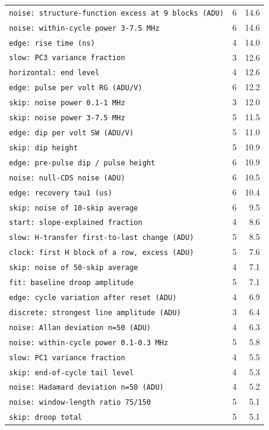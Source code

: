 \documentclass[10pt]{article}
\renewcommand{\_}{\oldunderscore\allowbreak}
\begin{document}
\begin{longtable}{>{\raggedright\arraybackslash}p{}rr}
\texttt{noise: structure-function excess at 9 blocks (ADU)} & 6 & 14.6 \\
\texttt{noise: within-cycle power 3-7.5 MHz} & 6 & 14.6 \\
\texttt{edge: rise time (ns)} & 4 & 14.0 \\
\texttt{slow: PC3 variance fraction} & 3 & 12.6 \\
\texttt{horizontal: end level} & 4 & 12.6 \\
\texttt{edge: pulse per volt RG (ADU/V)} & 6 & 12.2 \\
\texttt{skip: noise power 0.1-1 MHz} & 3 & 12.0 \\
\texttt{skip: noise power 3-7.5 MHz} & 5 & 11.5 \\
\texttt{edge: dip per volt SW (ADU/V)} & 5 & 11.0 \\
\texttt{skip: dip height} & 5 & 10.9 \\
\texttt{edge: pre-pulse dip / pulse height} & 6 & 10.9 \\
\texttt{noise: null-CDS noise (ADU)} & 6 & 10.5 \\
\texttt{edge: recovery tau1 (us)} & 6 & 10.4 \\
\texttt{skip: noise of 10-skip average} & 6 & 9.5 \\
\texttt{start: slope-explained fraction} & 4 & 8.6 \\
\texttt{slow: H-transfer first-to-last change (ADU)} & 5 & 8.5 \\
\texttt{clock: first H block of a row, excess (ADU)} & 5 & 7.6 \\
\texttt{skip: noise of 50-skip average} & 4 & 7.1 \\
\texttt{fit: baseline droop amplitude} & 5 & 7.1 \\
\texttt{edge: cycle variation after reset (ADU)} & 4 & 6.9 \\
\texttt{discrete: strongest line amplitude (ADU)} & 3 & 6.4 \\
\texttt{noise: Allan deviation n=50 (ADU)} & 4 & 6.3 \\
\texttt{noise: within-cycle power 0.1-0.3 MHz} & 5 & 5.8 \\
\texttt{slow: PC1 variance fraction} & 4 & 5.5 \\
\texttt{skip: end-of-cycle tail level} & 4 & 5.3 \\
\texttt{noise: Hadamard deviation n=50 (ADU)} & 4 & 5.2 \\
\texttt{noise: window-length ratio 75/150} & 5 & 5.1 \\
\texttt{skip: droop total} & 5 & 5.1 \\

\end{longtable}
\end{document}
